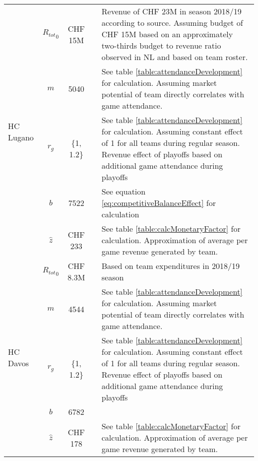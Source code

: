 \begin{longtable}[h!]{p{1.5cm}cc>{\baselineskip=13pt}p{3cm}>{\baselineskip=13pt}p{5.5cm}}
    \multirow[t]{5}{=}{HC Lugano} & ${R_{tot}}_{0}$ & CHF 15M & \cite{noauthor_deficit_2019} & 
    Revenue of CHF 23M in season 2018/19 according to source. Assuming budget of CHF 15M based on an approximately two-thirds budget to revenue ratio observed in NL and based on team roster. \\
                                 & $m$ & 5040 & \cite{national_league_zuschauerzahlen_2022} & See table \ref{table:attendanceDevelopment} for calculation. Assuming market potential of team directly correlates with game attendance. \\
                                 & $r_g$ & \{1, 1.2\} & \cite{national_league_zuschauerzahlen_2022} & See table \ref{table:attendanceDevelopment} for calculation. Assuming constant effect of 1 for all teams during regular season. Revenue effect of playoffs based on additional game attendance during playoffs \\
                                 & $b$ & 7522 &  & See equation \ref{eq:competitiveBalanceEffect} for calculation \\
                                 & $\hat{z}$ & CHF 233 &  & See table \ref{table:calcMonetaryFactor} for calculation. Approximation of average per game revenue generated by team. \\
    \midrule
    
    \multirow[t]{5}{=}{HC Davos} & ${R_{tot}}_{0}$ & CHF 8.3M &                                                                   \cite{hockey_club_davos_ag_geschaftsbericht_2019} & Based on team expenditures in 2018/19 season \\
                                & $m$ & 4544 & \cite{national_league_zuschauerzahlen_2022} & See table \ref{table:attendanceDevelopment} for calculation. Assuming market potential of team directly correlates with game attendance. \\
                                & $r_g$ & \{1, 1.2\} & \cite{national_league_zuschauerzahlen_2022} & See table \ref{table:attendanceDevelopment} for calculation. Assuming constant effect of 1 for all teams during regular season. Revenue effect of playoffs based on additional game attendance during playoffs \\
                                & $b$ & 6782 &  & \\
                                & $\hat{z}$ & CHF 178 &  & See table \ref{table:calcMonetaryFactor} for calculation. Approximation of average per game revenue generated by team. \\
    \midrule
    

\end{longtable}
